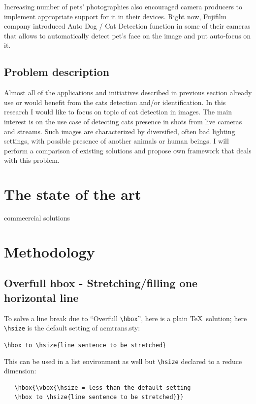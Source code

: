 \documentclass[hyperref]{acmtrans2e}
\begin{document}
Increasing number of pets' photographies also encouraged camera producers to implement appropriate support for it in their devices. Right now, Fujifilm company introduced Auto Dog / Cat Detection function \cite{FujiFilm:2009} in some of their cameras that allows to automatically detect pet's face on the image and put auto-focus on it. 
 
\subsection{Problem description}
Almost all of the applications and initiatives described in previous section already use or would benefit from the cats detection and/or identification. In this research I would like to focus on topic of cat detection in images. The main interest is on the use case of detecting cats presence in shots from live cameras and streams. Such images are characterized by  diversified, often bad lighting settings, with possible presence of another animals or human beings. I will perform a comparison of existing solutions and propose own framework that deals with this problem.

\section{The state of the art}
commeercial solutions
\section{Methodology}

\subsection{Overfull hbox - Stretching/filling one horizontal line}

To solve a line break due to ``Overfull \verb|\hbox|'', here is a plain \TeX\ 
solution; here \verb|\hsize| is the default setting of acmtrans.sty:

\begin{center}
\verb|\hbox to \hsize{line sentence to be stretched}|
\end{center}

This can be used in a list environment as well but \verb|\hsize| declared to a reduce
dimension:

\begin{verbatim}
   \hbox{\vbox{\hsize = less than the default setting
   \hbox to \hsize{line sentence to be stretched}}}
\end{verbatim}
\end{document}
